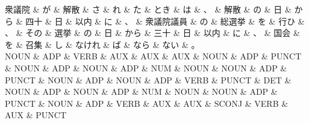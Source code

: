 \documentclass[tikz,border=5pt]{standalone}
\begin{document}
\small
\begin{dependency}[edge unit distance=12.0pt]
    \begin{deptext}[column sep=0.5em]
        衆議院 \& が \& 解散 \& さ \& れ \& た \& とき \& は \& 、 \& 解散 \& の \& 日 \& から \& 四十 \& 日 \& 以内 \& に \& 、 \& 衆議院議員 \& の \& 総選挙 \& を \& 行ひ \& 、 \& その \& 選挙 \& の \& 日 \& から \& 三十 \& 日 \& 以内 \& に \& 、 \& 国会 \& を \& 召集 \& し \& なけれ \& ば \& なら \& ない \& 。\\
        NOUN \& ADP \& VERB \& AUX \& AUX \& AUX \& NOUN \& ADP \& PUNCT \& NOUN \& ADP \& NOUN \& ADP \& NUM \& NOUN \& NOUN \& ADP \& PUNCT \& NOUN \& ADP \& NOUN \& ADP \& VERB \& PUNCT \& DET \& NOUN \& ADP \& NOUN \& ADP \& NUM \& NOUN \& NOUN \& ADP \& PUNCT \& NOUN \& ADP \& VERB \& AUX \& AUX \& SCONJ \& VERB \& AUX \& PUNCT\\
    \end{deptext}
\end{dependency}
\end{document}
